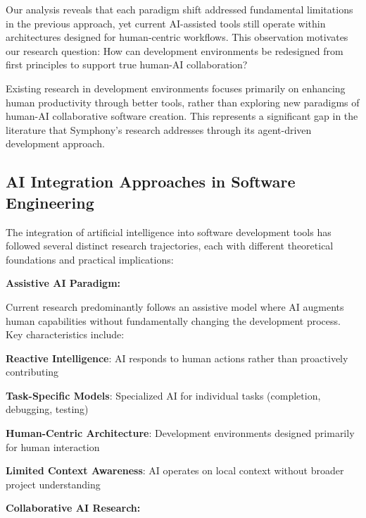 Our analysis reveals that each paradigm shift addressed fundamental limitations in the previous approach, yet current AI-assisted tools still operate within architectures designed for human-centric workflows. This observation motivates our research question: How can development environments be redesigned from first principles to support true human-AI collaboration?

\begin{infobox}[title=Research Gap Identification]
Existing research in development environments focuses primarily on enhancing human productivity through better tools, rather than exploring new paradigms of human-AI collaborative software creation. This represents a significant gap in the literature that Symphony's research addresses through its agent-driven development approach.
\end{infobox}

\subsection{AI Integration Approaches in Software Engineering}
\label{subsec:ai-integration-approaches}

The integration of artificial intelligence into software development tools has followed several distinct research trajectories, each with different theoretical foundations and practical implications:

\textbf{Assistive AI Paradigm:}

Current research predominantly follows an assistive model where AI augments human capabilities without fundamentally changing the development process. Key characteristics include:

\begin{compactlist}
    \item \textbf{Reactive Intelligence}: AI responds to human actions rather than proactively contributing
    \item \textbf{Task-Specific Models}: Specialized AI for individual tasks (completion, debugging, testing)
    \item \textbf{Human-Centric Architecture}: Development environments designed primarily for human interaction
    \item \textbf{Limited Context Awareness}: AI operates on local context without broader project understanding
\end{compactlist}

\textbf{Collaborative AI Research:}

